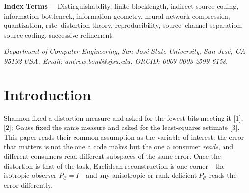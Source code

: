 \documentclass[lettersize,onecolumn]{IEEEtran}
\theoremstyle{definition}
\theoremstyle{remark}
\newcommand{\PC}{P_{\mathcal{C}}}
\begin{document}
\medskip\noindent\textbf{Index Terms---}
Distinguishability, finite blocklength, indirect source coding, information bottleneck,
information geometry, neural network compression, quantization, rate--distortion theory,
reproducibility, source--channel separation, source coding, successive refinement.


\IEEEpeerreviewmaketitle

\noindent\emph{Department of Computer Engineering, San Jos\'e State University, San Jos\'e, CA 95192 USA. Email: andrew.bond@sjsu.edu. ORCID: 0009-0003-2599-6158.}


\section{Introduction}

Shannon fixed a distortion measure and asked for the fewest bits meeting it
[1], [2]; Gauss fixed the same measure and asked for the
least-squares estimate [3]. This paper reads their common assumption
as the variable of interest: the error that matters is not the one a code makes but
the one a consumer \emph{reads}, and different consumers read different subspaces of
the same error. Once the distortion is that of the task, Euclidean reconstruction is one
corner---the isotropic observer $\PC=I$---and any anisotropic or rank-deficient $\PC$
reads the error differently.
\end{document}
